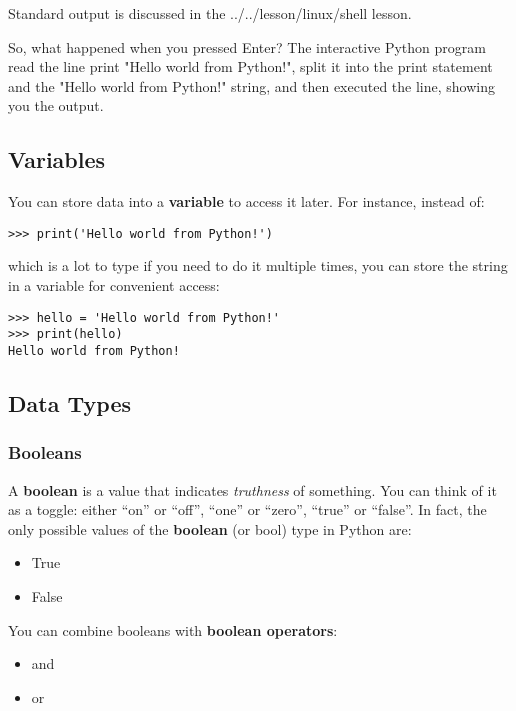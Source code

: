 Standard output is discussed in the ../../lesson/linux/shell lesson.

So, what happened when you pressed Enter? The interactive Python program
read the line print "Hello world from Python!", split it into the print
statement and the "Hello world from Python!" string, and then executed
the line, showing you the output.

\subsection{Variables}\label{variables}

You can store data into a \textbf{variable} to access it later. For
instance, instead of:

\begin{verbatim}
>>> print('Hello world from Python!')
\end{verbatim}

which is a lot to type if you need to do it multiple times, you can
store the string in a variable for convenient access:

\begin{verbatim}
>>> hello = 'Hello world from Python!'
>>> print(hello)
Hello world from Python!
\end{verbatim}

\subsection{Data Types}\label{data-types}

\subsubsection{Booleans}\label{booleans}

A \textbf{boolean} is a value that indicates \emph{truthness} of
something. You can think of it as a toggle: either ``on'' or ``off'',
``one'' or ``zero'', ``true'' or ``false''. In fact, the only possible
values of the \textbf{boolean} (or bool) type in Python are:

\begin{itemize}
\tightlist
\item
  True
\item
  False
\end{itemize}

You can combine booleans with \textbf{boolean operators}:

\begin{itemize}
\tightlist
\item
  and
\item
  or
\end{itemize}

